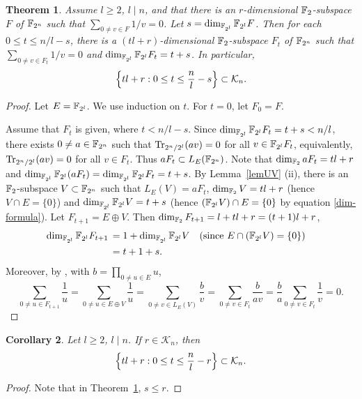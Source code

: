 \documentclass{amsart}
\newtheorem{thm}{Theorem}[section]
\newtheorem{cor}[thm]{Corollary}
\numberwithin{equation}{section}
\theoremstyle{definition}
\newcommand{\f}{\Bbb F}
\newcommand{\tr}{\text{\rm Tr}}
\begin{document}
\begin{thm}\label{main1}
Assume $l\ge 2$, $l\mid n$, and that there is an $r$-dimensional $\f_2$-subspace $F$ of $\f_{2^n}$ such that $\sum_{0\ne v\in F}1/v=0$. Let $s=\dim_{\f_{2^l}}\f_{2^l}F$. Then for each $0\le t\le n/l-s$, there is a $(tl+r)$-dimensional $\f_2$-subspace $F_t$ of $\f_{2^n}$ such that $\sum_{0\ne v\in F_t}1/v=0$ and $\dim_{\f_{2^l}}\f_{2^l}F_t=t+s$. In particular, 
\[
\Bigl\{tl+r: 0\le t\le \frac nl-s\Bigr\}\subset\mathcal K_n.
\]
\end{thm}

\begin{proof}
Let $E=\f_{2^l}$. We use induction on $t$. For $t=0$, let $F_0=F$.

Assume that $F_t$ is given, where $t<n/l-s$. Since $\dim_{\f_{2^l}}\f_{2^l}F_t=t+s<n/l$, there exists $0\ne a\in\f_{2^n}$ such that $\tr_{2^n/2^l}(av)=0$ for all $v\in\f_{2^l}F_t$, equivalently, $\tr_{2^n/2^l}(av)=0$ for all $v\in F_t$. Thus $aF_t\subset L_E(\f_{2^n})$. Note that $\dim_{\f_2} aF_t=tl+r$ and $\dim_{\f_{2^l}}\f_{2^l}(aF_t)=\dim_{\f_{2^l}}\f_{2^l}F_t=t+s$. By Lemma~\ref{lemUV} (ii), there is an $\f_2$-subspace $V\subset\f_{2^n}$ such that $L_E(V)=aF_t$, $\dim_{\f_2}V=tl+r$ (hence $V\cap E=\{0\}$) and $\dim_{\f_{2^l}}\f_{2^l}V=t+s$ (hence $(\f_{2^l}V)\cap E=\{0\}$ by equation \eqref{dim-formula}). Let $F_{t+1}=E\oplus V$. Then $\dim_{\f_2}F_{t+1}=l+tl+r=(t+1)l+r$,
\begin{align*}
\dim_{\f_{2^l}}\f_{2^l}F_{t+1}\,&=1+\dim_{\f_{2^l}}\f_{2^l}V\quad\text{(since $E\cap(\f_{2^l}V)=\{0\}$)}\cr
&=t+1+s.
\end{align*}
Moreover, by \cite[Corollary~1]{Carlet-pre}, with $b=\prod_{0\ne u\in E}u$,
\[
\sum_{0\ne u\in F_{t+1}}\frac 1u=\sum_{0\ne u\in E\oplus V}\frac 1u=\sum_{0\ne v\in L_E(V)}\frac bv=\sum_{0\ne v\in F_t}\frac b{av}=\frac ba\sum_{0\ne v\in F_t}\frac 1v=0.
\]
\end{proof}

\begin{cor}\label{c-main1}
Let $l\ge 2$, $l\mid n$. If $r\in\mathcal K_n$, then
\[
\Bigl\{tl+r:0\le t\le \frac nl-r\Bigr\}\subset\mathcal K_n.
\]
\end{cor}

\begin{proof}
Note that in Theorem~\ref{main1}, $s\le r$.
\end{proof}
\end{document}
